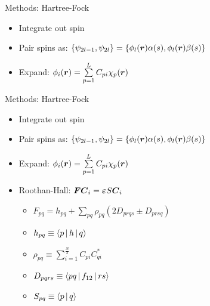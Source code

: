 \documentclass[10pt, t, xcolor=dvipsnames]{beamer}
\begin{document}
{{\begin{frame}[fragile]{Methods: Hartree-Fock}
    \begin{itemize}
        \item Integrate out spin
        \item Pair spins as: $\{\psi_{2l-1}, \psi_{2l}\} =
            \{\phi_l(\bm{{r}})\alpha(s),\phi_l(\bm{{r}})\beta(s)\}$
        \item Expand: $\phi_i(\bm{{r}}) = \sum\limits^L_{p=1} C_{pi}\chi_p(\bm{{r}})$
    \end{itemize}
\end{frame}

\begin{frame}[fragile]{Methods: Hartree-Fock}
    \begin{itemize}
        \item Integrate out spin
        \item Pair spins as: $\{\psi_{2l-1}, \psi_{2l}\} =
            \{\phi_l(\bm{{r}})\alpha(s),\phi_l(\bm{{r}})\beta(s)\}$
        \item Expand: $\phi_i(\bm{{r}}) = \sum\limits^L_{p=1} C_{pi}\chi_p(\bm{{r}})$
        \item Roothan-Hall: $\bm{{F}}\bm{{C}}_i = \bm{{\varepsilon}}S\bm{{C}}_i$
            \begin{itemize}
                \item $F_{pq} = h_{pq} + \sum\limits_{pq}\rho_{pq}\left(2D_{prqs} \pm D_{prsq}\right)$
                \vsp
                \item $h_{pq} \equiv \Braket{p | h | q}$
                \vsp
                \item $\rho_{pq} \equiv \sum\limits^{\frac{N}{2}}_{i=1} C_{pi}C^{*}_{qi}$
                \vsp
                \item $D_{pqrs} \equiv \Braket{pq | f_{12} | rs}$
                \item $S_{pq} \equiv \Braket{p | q}$
            \end{itemize}
    \end{itemize}
\end{frame}

}}
\end{document}
